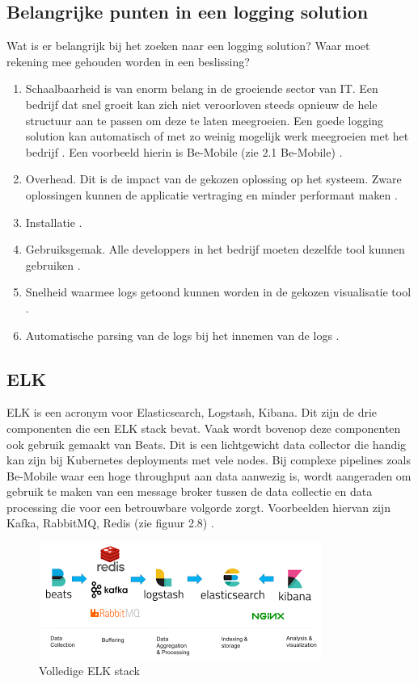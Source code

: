 \subsection{Belangrijke punten in een logging solution}

Wat is er belangrijk bij het zoeken naar een logging solution? Waar moet rekening mee gehouden worden in een beslissing?

\begin{enumerate}
    \item  Schaalbaarheid is van enorm belang in de groeiende sector van IT. Een bedrijf dat snel groeit kan zich niet veroorloven steeds opnieuw de hele structuur aan te passen om deze te laten meegroeien. Een goede logging solution kan automatisch of met zo weinig mogelijk werk meegroeien met het bedrijf \autocite{logdna2018}. Een voorbeeld hierin is Be-Mobile (zie 2.1 Be-Mobile) \autocite{jens2019}. 
    \item Overhead. Dit is de impact van de gekozen oplossing op het systeem. Zware oplossingen kunnen de applicatie vertraging en minder performant maken \autocite{gifford2015}.
    \item Installatie \autocite{logdna2018}.
    \item Gebruiksgemak. Alle developpers in het bedrijf moeten dezelfde tool kunnen gebruiken \autocite{logdna2018}.
    \item Snelheid waarmee logs getoond kunnen worden in de gekozen visualisatie tool \autocite{logdna2018}.
    \item Automatische parsing van de logs bij het innemen van de logs \autocite{logdna2018}.
\end{enumerate}

\subsection{ELK}
ELK is een acronym voor Elasticsearch, Logstash, Kibana. Dit zijn de drie componenten die een ELK stack bevat. Vaak wordt bovenop deze componenten ook gebruik gemaakt van Beats. Dit is een lichtgewicht data collector die handig kan zijn bij Kubernetes deployments met vele nodes. Bij complexe pipelines zoals Be-Mobile waar een hoge throughput aan data aanwezig is, wordt aangeraden om gebruik te maken van een message broker tussen de data collectie en data processing die voor een betrouwbare volgorde zorgt. Voorbeelden hiervan zijn Kafka, RabbitMQ, Redis (zie figuur 2.8) \autocite{berman2018-12}. 

\begin{figure}[ht]
    \centering
    \includegraphics[scale=1]{img/elk-proces}
    \caption[Volledige ELK stack]{Volledige ELK stack \cite{berman2018-12}}
\end{figure}

